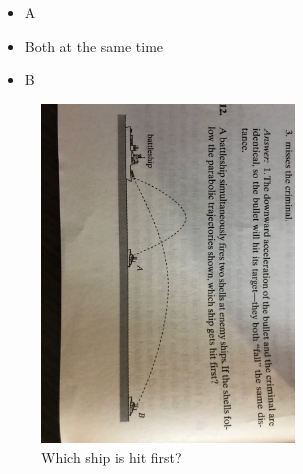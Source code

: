 \documentclass[10pt]{article}
\begin{document}
\begin{enumerate}
\begin{itemize}
\item A
\item Both at the same time
\item B
\end{itemize}
\begin{figure}[hb]
\centering
\includegraphics[width=0.6\textwidth,trim=0cm 30cm 0cm 45cm,clip=true]{battle.jpeg}
\caption{\label{fig:battle} Which ship is hit first?}
\end{figure}
\end{enumerate}
\end{document}
